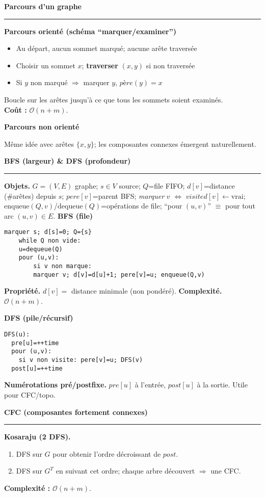 \documentclass[9pt,a4paper]{article}
\newcommand{\bigO}{\mathcal{O}}
\newcommand{\sect}[1]{\vspace{1ex}\textbf{\large #1}\par\vspace{0.3ex}\hrule\vspace{0.6ex}}
\newcommand{\subsect}[1]{\vspace{0.4ex}\textbf{#1}\par}
\begin{document}
\begin{multicols}{3}
    \sect{Parcours d'un graphe}
    \subsect{Parcours orienté (schéma ``marquer/examiner'')}
    \begin{itemize}
        \item Au départ, aucun sommet marqué; aucune arête traversée
        \item Choisir un sommet $x$; \textbf{traverser} $(x,y)$ si non traversée
        \item Si $y$ non marqué $\Rightarrow$ marquer $y$, $père(y)=x$
    \end{itemize}
    Boucle sur les arêtes jusqu'à ce que tous les sommets soient examinés.\\
    \textbf{Coût :} $\bigO(n+m)$.

    \subsect{Parcours non orienté}
    Même idée avec arêtes $\{x,y\}$; les composantes connexes émergent naturellement.

    \sect{BFS (largeur) \& DFS (profondeur)}
    \textbf{Objets.} $G=(V,E)$ graphe; $s\in V$ source; $Q$=file FIFO; $d[v]$=distance (\#arêtes) depuis $s$; $pere[v]$=parent BFS; \textit{marquer} $v$ $\Leftrightarrow$ $visited[v]\leftarrow\text{vrai}$; $\mathrm{enqueue}(Q,v)$/$\mathrm{dequeue}(Q)$=opérations de file; ``pour $(u,v)$'' $\equiv$ pour tout arc $(u,v)\in E$.
    \subsect{BFS (file)}
    \begin{lstlisting}[style=tight]
    marquer s; d[s]=0; Q={s}
    while Q non vide:
    u=dequeue(Q)
    pour (u,v):
        si v non marque:
        marquer v; d[v]=d[u]+1; pere[v]=u; enqueue(Q,v)
    \end{lstlisting}
    \textbf{Propriété.} $d[v]=$ distance minimale (non pondéré). \quad \textbf{Complexité.} $\bigO(n+m)$.

    \subsect{DFS (pile/récursif)}
    \begin{lstlisting}[style=tight]
DFS(u):
  pre[u]=++time
  pour (u,v):
    si v non visite: pere[v]=u; DFS(v)
  post[u]=++time
\end{lstlisting}
    \textbf{Numérotations pré/postfixe.} $pre[u]$ à l'entrée, $post[u]$ à la sortie. Utile pour CFC/topo.

    \sect{CFC (composantes fortement connexes)}
    \textbf{Kosaraju (2 DFS).}
    \begin{enumerate}
        \item DFS sur $G$ pour obtenir l'ordre décroissant de $post$.
        \item DFS sur $G^{T}$ en suivant cet ordre; chaque arbre découvert $\Rightarrow$ une CFC.
    \end{enumerate}
    \textbf{Complexité :} $\bigO(n+m)$.


\end{multicols}
\end{document}
